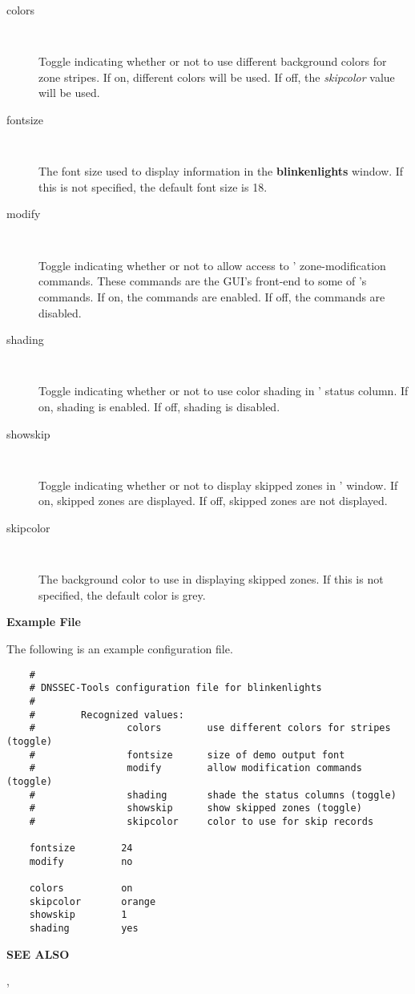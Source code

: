 \begin{description}

\item [colors]\verb" "

Toggle indicating whether or not to use different background colors for
 zone stripes.
If on, different colors will be used.
If off, the {\it skipcolor} value will be used.

\item [fontsize]\verb" "

The font size used to display information in the {\bf blinkenlights} window.
If this is not specified, the default font size is 18.

\item [modify]\verb" "

Toggle indicating whether or not to allow access to '
zone-modification commands.  These commands are the GUI's front-end to
some of 's commands.
If on, the commands are enabled.
If off, the commands are disabled.

\item [shading]\verb" "

Toggle indicating whether or not to use color shading in '
status column.
If on, shading is enabled.
If off, shading is disabled.

\item [showskip]\verb" "

Toggle indicating whether or not to display skipped zones in
' window.
If on, skipped zones are displayed.
If off, skipped zones are not displayed.

\item [skipcolor]\verb" "

The background color to use in displaying skipped zones.
If this is not specified, the default color is grey.

\end{description}

{\bf Example File}

The following is an example  configuration file.

\begin{verbatim}
    #
    # DNSSEC-Tools configuration file for blinkenlights
    #
    #        Recognized values:
    #                colors        use different colors for stripes (toggle)
    #                fontsize      size of demo output font
    #                modify        allow modification commands (toggle)
    #                shading       shade the status columns (toggle)
    #                showskip      show skipped zones (toggle)
    #                skipcolor     color to use for skip records

    fontsize        24
    modify          no

    colors          on
    skipcolor       orange
    showskip        1
    shading         yes
\end{verbatim}

{\bf SEE ALSO}

,

